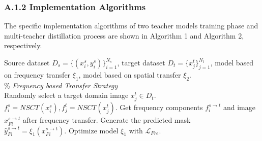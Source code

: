 \documentclass[letterpaper]{article} %
\begin{document}
\subsubsection{A.1.2 Implementation Algorithms}
The specific implementation algorithms of two teacher models training phase and multi-teacher distillation process are shown in Algorithm 1 and Algorithm 2, 
respectively. 

\begin{algorithm}[!h]
	\renewcommand{\algorithmicrequire}{\textbf{Require:}}
	\renewcommand{\algorithmicensure}{\textbf{Output:}}
	\caption{Training process of the two teacher models.}
	\label{alg1}
	\begin{algorithmic}[1]
        \REQUIRE Source dataset $D_s=\{(x_i^s,y_i^s)\}_{i=1}^{N_s}$, target dataset $D_t=\{x_j^t\}_{j=1}^{N_t}$, model based on frequency 
        transfer $\xi _1$, model based on spatial transfer $\xi _2$. \\


        \% \textit{Frequency based Transfer Strategy}\\
        
                \STATE Randomly select a target domain image $x_j^t \in D_t$.\\
                \STATE $f_i^s=NSCT(x_i^s ),f_j^t=NSCT(x_j^t ).$
                \STATE Get frequency components $f_i^{s\to t}$ and image $x_{Fi}^{s\to t}$ after frequency transfer.
                \STATE Generate the predicted mask \\
                $\hat{y}_{Fi}^{s\to t}=\xi_1\left(x_{Fi}^{s\to t}\right)$.
                \STATE Optimize model $\xi_1$ with $\mathcal{L}_{Fre}$.
            \ENDFOR
        \ENDFOR \\


\end{algorithmic}
\end{algorithm}
\end{document}
